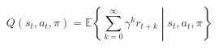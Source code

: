 \[
    Q(s_t,a_t,\pi) = \mathbb{E}\left\{\sum_{k=0}^{\infty}\gamma^kr_{t+k}\middle| s_t,a_t,\pi\right\}
\]
